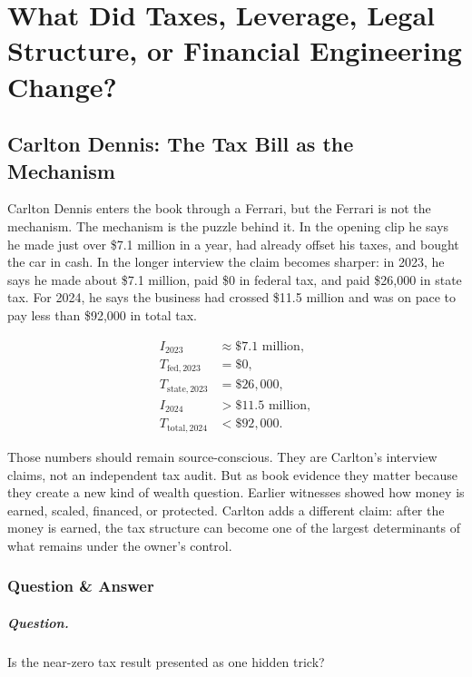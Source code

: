 \documentclass[11pt,oneside]{book}
\begin{document}
\chapter{What Did Taxes, Leverage, Legal Structure, or Financial Engineering Change?}

\section{Carlton Dennis: The Tax Bill as the Mechanism}

Carlton Dennis enters the book through a Ferrari, but the Ferrari is not the mechanism. The mechanism is the puzzle behind it. In the opening clip he says he made just over \$7.1 million in a year, had already offset his taxes, and bought the car in cash. In the longer interview the claim becomes sharper: in 2023, he says he made about \$7.1 million, paid \$0 in federal tax, and paid \$26,000 in state tax. For 2024, he says the business had crossed \$11.5 million and was on pace to pay less than \$92,000 in total tax.

\begin{align}
I_{2023} &\approx \$7.1\text{ million},\\
T_{\mathrm{fed},2023} &= \$0,\\
T_{\mathrm{state},2023} &= \$26{,}000,\\
I_{2024} &> \$11.5\text{ million},\\
T_{\mathrm{total},2024} &< \$92{,}000.
\end{align}

Those numbers should remain source-conscious. They are Carlton's interview claims, not an independent tax audit. But as book evidence they matter because they create a new kind of wealth question. Earlier witnesses showed how money is earned, scaled, financed, or protected. Carlton adds a different claim: after the money is earned, the tax structure can become one of the largest determinants of what remains under the owner's control.

\subsection{Question \& Answer}

\paragraph{Question.}
Is the near-zero tax result presented as one hidden trick?
\end{document}
